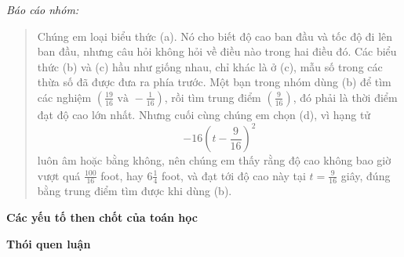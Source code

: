 {    \emph{Báo cáo nhóm:}

    \begin{quote}
      Chúng em loại biểu thức (a). Nó cho biết độ cao ban đầu và tốc độ đi lên ban đầu, nhưng câu hỏi không hỏi về điều nào trong hai điều đó. Các biểu thức (b) và (c) hầu như giống nhau, chỉ khác là ở (c), mẫu số trong các thừa số đã được đưa ra phía trước. Một bạn trong nhóm dùng (b) để tìm các nghiệm $\left(\frac{19}{16} \text{ và } -\frac{1}{16}\right)$, rồi tìm trung điểm $\left(\frac{9}{16}\right)$, đó phải là thời điểm đạt độ cao lớn nhất. Nhưng cuối cùng chúng em chọn (d), vì hạng tử
      $$
        -16\left(t-\frac{9}{16}\right)^2
      $$
      luôn âm hoặc bằng không, nên chúng em thấy rằng độ cao không bao giờ vượt quá $\frac{100}{16}$ foot, hay $6\frac{1}{4}$ foot, và đạt tới độ cao này tại $t=\frac{9}{16}$ giây, đúng bằng trung điểm tìm được khi dùng (b).
    \end{quote}

    \textbf{Các yếu tố then chốt của toán học}

    \begin{hanglist}
      \vspace{\baselineskip}
    \end{hanglist}

    \textbf{Thói quen luận}
    
    \begin{hanglist}
      \vspace{\baselineskip}

    \end{hanglist}
  }{}

